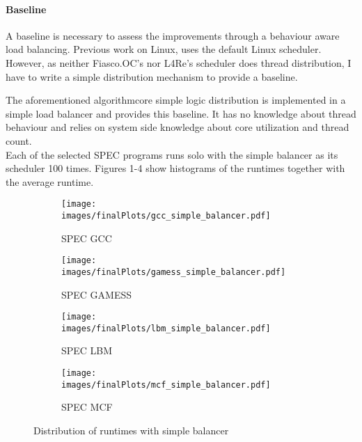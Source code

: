 \paragraph{Baseline}

A baseline is necessary to assess the improvements through a behaviour aware
load balancing.
Previous work on Linux, uses the default Linux scheduler.
However, as neither Fiasco.OC's nor L4Re's scheduler does thread distribution,
I have to write a simple distribution mechanism to provide a baseline.

The aforementioned algorithmcore simple logic distribution is implemented in a
simple load balancer and provides this baseline.
It has no knowledge about thread behaviour and relies on system side
knowledge about core utilization and thread count.
\\

Each of the selected SPEC programs runs solo with the simple balancer as its
scheduler 100 times.
Figures 1-4 show histograms of the runtimes together with the average runtime.

\begin{figure}[h!]
  \begin{subfigure}{.49\textwidth}
    \texttt{[image: images/finalPlots/gcc\_simple\_balancer.pdf]}
    \caption{SPEC GCC}
    \label{baseline:gcc}
  \end{subfigure}
  \begin{subfigure}{.49\textwidth}
    \texttt{[image: images/finalPlots/gamess\_simple\_balancer.pdf]}
    \caption{SPEC GAMESS}
    \label{baseline:gamess}
  \end{subfigure}
  \begin{subfigure}{.49\textwidth}
    \texttt{[image: images/finalPlots/lbm\_simple\_balancer.pdf]}
    \caption{SPEC LBM}
    \label{baseline:gcc}
  \end{subfigure}
  \begin{subfigure}{.49\textwidth}
    \texttt{[image: images/finalPlots/mcf\_simple\_balancer.pdf]}
    \caption{SPEC MCF}
    \label{baseline:gamess}
  \end{subfigure}
  \caption{Distribution of runtimes with simple balancer}
\end{figure}
